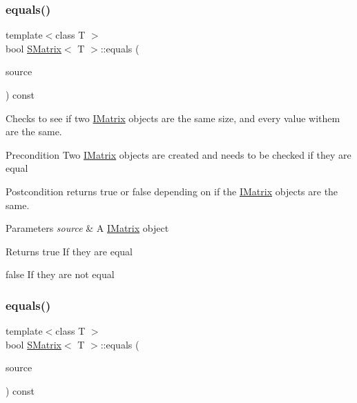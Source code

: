 \subsubsection{\texorpdfstring{equals()}{equals()}\hspace{0.1cm}{\footnotesize\ttfamily [1/6]}}
{\footnotesize\ttfamily template$<$class T $>$ \\
bool \mbox{\hyperlink{class_s_matrix}{S\+Matrix}}$<$ T $>$\+::equals (\begin{DoxyParamCaption}\item[{const \mbox{\hyperlink{class_i_matrix}{I\+Matrix}}$<$ \mbox{\hyperlink{class_matrix}{Matrix}}$<$ T $>$, T $>$ \&}]{source }\end{DoxyParamCaption}) const}



Checks to see if two \mbox{\hyperlink{class_i_matrix}{I\+Matrix}} objects are the same size, and every value withem are the same. 

\begin{DoxyPrecond}{Precondition}
Two \mbox{\hyperlink{class_i_matrix}{I\+Matrix}} objects are created and needs to be checked if they are equal 
\end{DoxyPrecond}
\begin{DoxyPostcond}{Postcondition}
returns true or false depending on if the \mbox{\hyperlink{class_i_matrix}{I\+Matrix}} objects are the same.
\end{DoxyPostcond}

\begin{DoxyParams}{Parameters}
{\em source} & A \mbox{\hyperlink{class_i_matrix}{I\+Matrix}} object \\
\hline
\end{DoxyParams}
\begin{DoxyReturn}{Returns}
true If they are equal 

false If they are not equal 
\end{DoxyReturn}
\mbox{\label{class_s_matrix_ab7f5292767d30a60b81b2fa119bba727}} 
\subsubsection{\texorpdfstring{equals()}{equals()}\hspace{0.1cm}{\footnotesize\ttfamily [2/6]}}
{\footnotesize\ttfamily template$<$class T $>$ \\
bool \mbox{\hyperlink{class_s_matrix}{S\+Matrix}}$<$ T $>$\+::equals (\begin{DoxyParamCaption}\item[{const \mbox{\hyperlink{class_i_matrix}{I\+Matrix}}$<$ \mbox{\hyperlink{class_t_matrix}{T\+Matrix}}$<$ T $>$, T $>$ \&}]{source }\end{DoxyParamCaption}) const}



